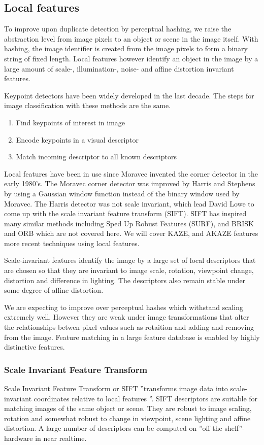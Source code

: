 \documentclass[english,12pt,a4paper,pdftex,elec,utf8]{aaltothesis}
\begin{document}
\subsection{Local features}
To improve upon duplicate detection by perceptual hashing, we raise the abstraction level from image pixels to an object or scene in the image itself. With hashing, the image identifier is created from the image pixels to form a binary string of fixed length. Local features however identify an object in the image by a large amount of scale-, illumination-, noise- and affine distortion invariant features.

Keypoint detectors have been widely developed in the last decade. The steps for image classification with these methods are the same.

\begin{enumerate}
\item Find keypoints of interest in image
\item Encode keypoints in a visual descriptor
\item Match incoming descriptor to all known descriptors
\end{enumerate}

Local features have been in use since Moravec invented the corner detector in the early 1980's. The Moravec corner detector was improved by Harris and Stephens by using a Gaussian window function instead of the binary window used by Moravec. The Harris detector was not scale invariant, which lead David Lowe to come up with the scale invariant feature transform (SIFT). SIFT has inspired many similar methods including Sped Up Robust Features (SURF), and BRISK and ORB which are not covered here. We will cover KAZE, and AKAZE features more recent techniques using local features.

Scale-invariant features identify the image by a large set of local descriptors that are chosen so that they are invariant to image scale, rotation, viewpoint change, distortion and difference in lighting. The descriptors also remain stable under some degree of affine distortion. \cite{Lowe2004}

We are expecting to improve over perceptual hashes which withstand scaling extremely well. However they are weak under image transformations that alter the relationships betwen pixel values such as rotaition and adding and removing from the image. Feature matching in a large feature database is enabled by highly distinctive features.

\subsubsection{Scale Invariant Feature Transform}
Scale Invariant Feature Transform or SIFT ''transforms image data into scale-invariant coordinates relative to local features \cite{Lowe2004}''. SIFT descriptors are suitable for matching images of the same object or scene. They are robust to image scaling, rotation and somewhat robust to change in viewpoint, scene lighting and affine distortion. A large number of descriptors can be computed on ''off the shelf''-hardware in near realtime. \cite{Lowe2004}
\end{document}
